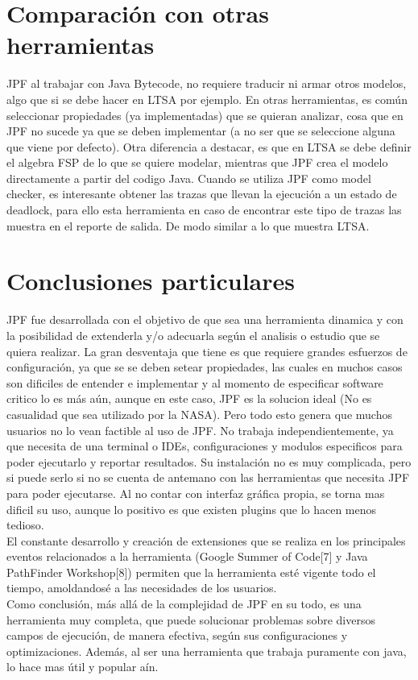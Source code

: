 \documentclass[runningheads]{llncs}
\begin{document}
\section{Comparaci\'on con otras herramientas}

JPF al trabajar con Java Bytecode, no requiere traducir ni armar otros modelos, algo que si se debe hacer en LTSA por ejemplo. En otras herramientas, es com\'un seleccionar propiedades (ya implementadas) que se quieran analizar, cosa que en JPF no sucede ya que se deben implementar (a no ser que se seleccione alguna que viene por defecto).
Otra diferencia a destacar, es que en LTSA se debe definir el algebra FSP de lo que se quiere modelar, mientras que JPF crea el modelo directamente a partir del codigo Java.
Cuando se utiliza JPF como model checker, es interesante obtener las trazas que llevan la ejecuci\'on a un estado de deadlock, para ello esta herramienta en caso de encontrar este tipo de trazas las muestra en el reporte de salida. De modo similar a lo que muestra LTSA.


\section{Conclusiones particulares}

JPF fue desarrollada con el objetivo de que sea una herramienta dinamica y con la posibilidad de extenderla y/o adecuarla seg\'un el analisis o estudio que se quiera realizar. La gran desventaja que tiene es que requiere grandes esfuerzos de configuraci\'on, ya que se se deben setear propiedades, las cuales en muchos casos son dificiles de entender e implementar y al momento de especificar software critico lo es m\'as a\'un, aunque en este caso, JPF es la solucion ideal (No es casualidad que sea utilizado por la NASA). Pero todo esto genera que muchos usuarios no lo vean factible al uso de JPF.
No trabaja independientemente, ya que necesita de una terminal o IDEs, configuraciones y modulos especificos para poder ejecutarlo y reportar resultados. Su instalaci\'on no es muy complicada, pero si puede serlo si no se cuenta de antemano con las herramientas que necesita JPF para poder ejecutarse. Al no contar con interfaz gr\'afica propia, se torna mas dificil su uso, aunque lo positivo es que existen plugins que lo hacen menos tedioso.\\
El constante desarrollo y creaci\'on de extensiones que se realiza en los principales eventos relacionados a la herramienta (Google Summer of Code[7] y Java PathFinder Workshop[8]) permiten que la herramienta est\'e vigente todo el tiempo, amoldandos\'e a las necesidades de los usuarios.\\
Como conclusi\'on, m\'as all\'a de la complejidad de JPF en su todo, es una herramienta muy completa, que puede solucionar problemas sobre diversos campos de ejecuci\'on, de manera efectiva, seg\'un sus configuraciones y optimizaciones. Adem\'as, al ser una herramienta que trabaja puramente con java, lo hace mas \'util y popular a\'in.
\end{document}
